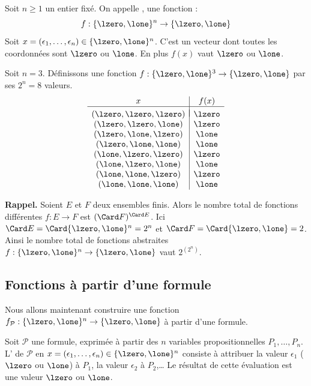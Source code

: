 \documentclass[11pt,class=report,crop=false]{standalone}
\begin{document}
Soit $n \ge 1$ un entier fixé.
On appelle , une fonction :
\[ 
f : \{\lzero,\lone\}^n \to \{\lzero,\lone\}
\]
Soit $x = (\epsilon_1,\ldots,\epsilon_n) \in \{\lzero,\lone\}^n$. C'est un vecteur dont toutes les coordonnées sont $\lzero$ ou $\lone$. En plus $f(x)$ vaut $\lzero$ ou $\lone$.

\begin{exemple}
Soit $n=3$. Définissons une fonction $f : \{\lzero,\lone\}^3 \to \{\lzero,\lone\}$ par ses $2^n=8$ valeurs.
\[
\begin{array}{c|c}
	x & f(x) \\
	\hline
	& \\[-2ex]
	(\lzero,\lzero,\lzero) & \lzero \\
	(\lzero,\lzero,\lone)  & \lzero \\
	(\lzero,\lone,\lzero)  & \lone \\
	(\lzero,\lone,\lone)   & \lone \\
	(\lone,\lzero,\lzero)  & \lzero \\
	(\lone,\lzero,\lone)   & \lone \\
	(\lone,\lone,\lzero)   & \lzero \\
	(\lone,\lone,\lone)    & \lone \\
\end{array}
\]
\end{exemple}

\textbf{Rappel.} Soient $E$ et $F$ deux ensembles finis. Alors le nombre total de fonctions différentes $f : E \to F$ est $(\Card F)^{\Card E}$.
Ici $\Card E = \Card \{\lzero,\lone\}^n = 2^n$ et $\Card F = \Card \{\lzero,\lone\} = 2$. Ainsi le nombre total de fonctions abstraites $f : \{\lzero,\lone\}^n \to \{\lzero,\lone\}$ vaut $2^{(2^n)}$.
 
 \subsection{Fonctions à partir d'une formule}

Nous allons maintenant construire une fonction $f_{\mathcal{P}} : \{\lzero,\lone\}^n \to \{\lzero,\lone\}$ à partir d'une formule.

Soit $\mathcal{P}$ une formule, exprimée à partir des $n$ variables propositionnelles $P_1,\ldots,P_n$.
L' de $\mathcal{P}$ en $x = (\epsilon_1,\ldots,\epsilon_n) \in \{\lzero,\lone\}^n$ consiste 
à attribuer la valeur $\epsilon_1$ ($\lzero$ ou $\lone$) à $P_1$, la valeur $\epsilon_2$ à $P_2$,\ldots{} Le résultat de cette évaluation est une valeur $\lzero$ ou $\lone$.
\end{document}
